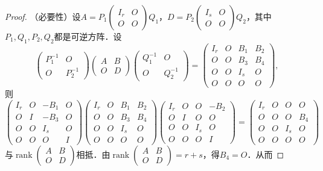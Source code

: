 \documentclass[a4paper,fontset=windows]{ctexbook}
\theoremstyle{definition}
\DeclareMathOperator{\rank}{rank}
\begin{document}
\begin{proof}
\noindent（必要性）设$A=P_1\begin{pmatrix}I_r&O \\ O&O\end{pmatrix}Q_1$，$D=P_2\begin{pmatrix}I_s&O \\ O&O\end{pmatrix}Q_2$，其中$P_1,Q_1,P_2,Q_2$都是可逆方阵．设
$$\begin{pmatrix}P_1^{-1}&O \\ O&P_2^{-1}\end{pmatrix}\begin{pmatrix}A&B \\ O&D\end{pmatrix}\begin{pmatrix}Q_1^{-1}&O \\ O&Q_2^{-1}\end{pmatrix}=\begin{pmatrix}I_r&O&B_1&B_2 \\ O&O&B_3&B_4 \\ O&O&I_s&O \\ O&O&O&O\end{pmatrix},$$
则
$$\begin{pmatrix}I_r&O&-B_1&O \\ O&I&-B_3&O \\ O&O&I_s&O \\ O&O&O&I\end{pmatrix}\begin{pmatrix}I_r&O&B_1&B_2 \\ O&O&B_3&B_4 \\ O&O&I_s&O \\ O&O&O&O\end{pmatrix}\begin{pmatrix}I_r&O&O&-B_2 \\ O&I&O&O \\ O&O&I_s&O \\ O&O&O&I\end{pmatrix}=\begin{pmatrix}I_r&O&O&O \\ O&O&O&B_4 \\ O&O&I_s&O \\ O&O&O&O\end{pmatrix}$$
与$\rank\begin{pmatrix}A&B \\ O&D\end{pmatrix}$相抵．由$\rank\begin{pmatrix}A&B \\ O&D\end{pmatrix}=r+s$，得$B_4=O$．从而

\end{proof}
\end{document}
